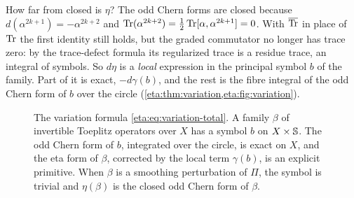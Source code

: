 \begin{discussion}
  How far from closed is $\eta$? The odd Chern forms are closed because
  $d(\alpha^{2k+1})=-\alpha^{2k+2}$ and $\operatorname{Tr}(\alpha^{2k+2})=\frac12\operatorname{Tr}[\alpha,\alpha^{2k+1}]
  =0$. With $\overline{\operatorname{Tr}}$ in place of $\operatorname{Tr}$ the first identity still holds, but the
  graded commutator no longer has trace zero: by the trace-defect formula its
  regularized trace is a residue trace, an integral of symbols. So $d\eta$ is a
  \emph{local} expression in the principal symbol $b$ of the family. Part of it is
  exact, $-d\gamma(b)$, and the rest is the fibre integral of the odd Chern form of
  $b$ over the circle (\cref{eta:thm:variation,eta:fig:variation}).
\end{discussion}

\begin{figure}[ht]
\centering
{}
\caption[Variation of the eta form]{The variation formula
\eqref{eta:eq:variation-total}. A family $\beta$ of invertible Toeplitz operators
over $X$ has a symbol $b$ on $X\times\mathbb{S}$. The odd Chern form of $b$, integrated
over the circle, is exact on $X$, and the eta form of $\beta$, corrected by the
local term $\gamma(b)$, is an explicit primitive. When $\beta$ is a smoothing
perturbation of $\Pi$, the symbol is trivial and $\eta(\beta)$ is the closed odd
Chern form of $\beta$.}
\label{eta:fig:variation}
\end{figure}


